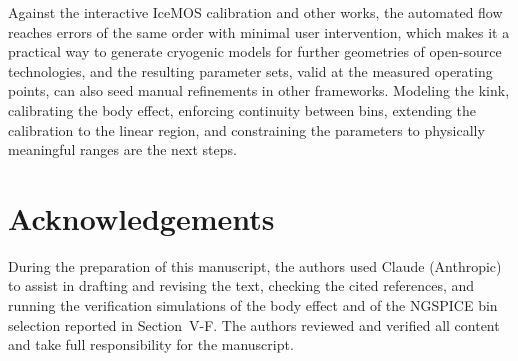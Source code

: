 \documentclass[a4paper,10pt,twoside,twocolumn,final]{JICS_LaTexGuidelines} %
\begin{document}
Against the interactive IceMOS calibration and other works, the automated flow reaches errors of the same order with minimal user intervention, which makes it a practical way to generate cryogenic models for further geometries of open-source technologies, and the resulting parameter sets, valid at the measured operating points, can also seed manual refinements in other frameworks. Modeling the kink, calibrating the body effect, enforcing continuity between bins, extending the calibration to the linear region, and constraining the parameters to physically meaningful ranges are the next steps.
\setcounter{secnumdepth}{0}
\section{Acknowledgements}
During the preparation of this manuscript, the authors used Claude (Anthropic) to assist in drafting and revising the text, checking the cited references, and running the verification simulations of the body effect and of the NGSPICE bin selection reported in Section~V-F. The authors reviewed and verified all content and take full responsibility for the manuscript.


\end{document}
